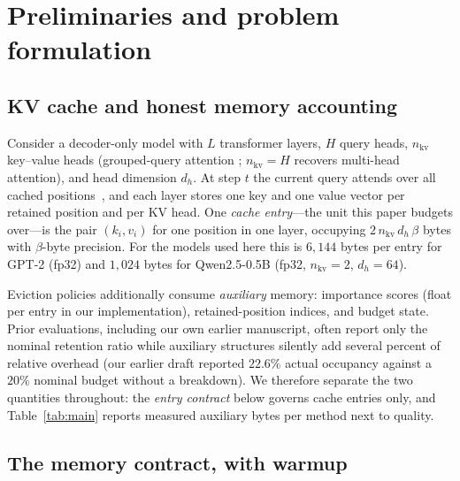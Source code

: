 \section{Preliminaries and problem formulation}\label{sec:prelim}

\subsection{KV cache and honest memory accounting}

Consider a decoder-only model with $L$ transformer layers, $H$ query
heads, $n_{\mathrm{kv}}$ key--value heads (grouped-query attention
\cite{ainslie2023gqa}; $n_{\mathrm{kv}}=H$ recovers multi-head
attention), and head dimension $d_h$. At step $t$ the current query
attends over all cached positions~\cite{vaswani2017attention}, and each layer
stores one key and one value vector per retained position and per KV head. One \emph{cache
entry}---the unit this paper budgets over---is the pair $(k_i, v_i)$ for
one position in one layer, occupying
$2\,n_{\mathrm{kv}}\,d_h\,\beta$ bytes with $\beta$-byte precision.
For the models used here this is $6{,}144$ bytes per entry for GPT-2
(fp32) and $1{,}024$ bytes for Qwen2.5-0.5B (fp32, $n_{\mathrm{kv}}=2$,
$d_h=64$).

Eviction policies additionally consume \emph{auxiliary} memory: importance
scores (float per entry in our implementation), retained-position indices,
and budget state. Prior evaluations, including our own earlier manuscript,
often report only the nominal retention ratio while auxiliary structures
silently add several percent of relative overhead (our earlier draft
reported $22.6\%$ actual occupancy against a $20\%$ nominal budget without
a breakdown). We therefore separate the two quantities throughout: the
\emph{entry contract} below governs cache entries only, and
Table~\ref{tab:main} reports measured auxiliary bytes per method next to
quality.

\subsection{The memory contract, with warmup}


